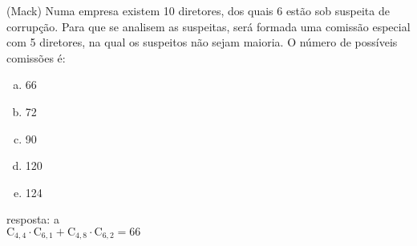 \begin{ex}
(Mack) Numa empresa existem 10 diretores, dos quais 6 estão sob suspeita de corrupção. Para que se analisem as suspeitas, será formada uma comissão especial com 5 diretores, na qual os suspeitos não sejam maioria. O número de possíveis comissões é:
   \begin{enumerate}[(a)]
   \item 66
   \item 72
   \item 90
   \item 120
   \item 124
   \end{enumerate}
    \begin{sol}
       resposta: a \\
       $\mathrm{C}_{4,4}\cdot\mathrm{C}_{6,1}+\mathrm{C}_{4,8}\cdot\mathrm{C}_{6,2}=66$
    \end{sol}
\end{ex}